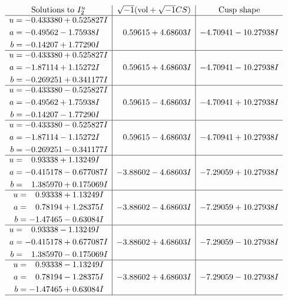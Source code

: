 \documentclass[1p]{elsarticle_modified}
\theoremstyle{definition}
\newcommand{\I}{\sqrt{-1}}
\begin{document}
$$\begin{array}{c|c|c}  
\text{Solutions to }I^u_{2}& \I (\text{vol} + \sqrt{-1}CS) & \text{Cusp shape}\\
 \hline 
\begin{aligned}
u &= -0.433380 + 0.525827 I \\
a &= -0.49562 - 1.75938 I \\
b &= -0.14207 + 1.77290 I\end{aligned}
 & \phantom{-}0.59615 + 4.68603 I & -4.70941 - 10.27938 I \\ \hline\begin{aligned}
u &= -0.433380 + 0.525827 I \\
a &= -1.87114 + 1.15272 I \\
b &= -0.269251 + 0.341177 I\end{aligned}
 & \phantom{-}0.59615 + 4.68603 I & -4.70941 - 10.27938 I \\ \hline\begin{aligned}
u &= -0.433380 - 0.525827 I \\
a &= -0.49562 + 1.75938 I \\
b &= -0.14207 - 1.77290 I\end{aligned}
 & \phantom{-}0.59615 - 4.68603 I & -4.70941 + 10.27938 I \\ \hline\begin{aligned}
u &= -0.433380 - 0.525827 I \\
a &= -1.87114 - 1.15272 I \\
b &= -0.269251 - 0.341177 I\end{aligned}
 & \phantom{-}0.59615 - 4.68603 I & -4.70941 + 10.27938 I \\ \hline\begin{aligned}
u &= \phantom{-}0.93338 + 1.13249 I \\
a &= -0.415178 - 0.677087 I \\
b &= \phantom{-}1.385970 + 0.175069 I\end{aligned}
 & -3.88602 - 4.68603 I & -7.29059 + 10.27938 I \\ \hline\begin{aligned}
u &= \phantom{-}0.93338 + 1.13249 I \\
a &= \phantom{-}0.78194 + 1.28375 I \\
b &= -1.47465 - 0.63084 I\end{aligned}
 & -3.88602 - 4.68603 I & -7.29059 + 10.27938 I \\ \hline\begin{aligned}
u &= \phantom{-}0.93338 - 1.13249 I \\
a &= -0.415178 + 0.677087 I \\
b &= \phantom{-}1.385970 - 0.175069 I\end{aligned}
 & -3.88602 + 4.68603 I & -7.29059 - 10.27938 I \\ \hline\begin{aligned}
u &= \phantom{-}0.93338 - 1.13249 I \\
a &= \phantom{-}0.78194 - 1.28375 I \\
b &= -1.47465 + 0.63084 I\end{aligned}
 & -3.88602 + 4.68603 I & -7.29059 - 10.27938 I\\
 \hline 
 \end{array}$$\newpage\newpage\renewcommand{\arraystretch}{1}
\end{document}

